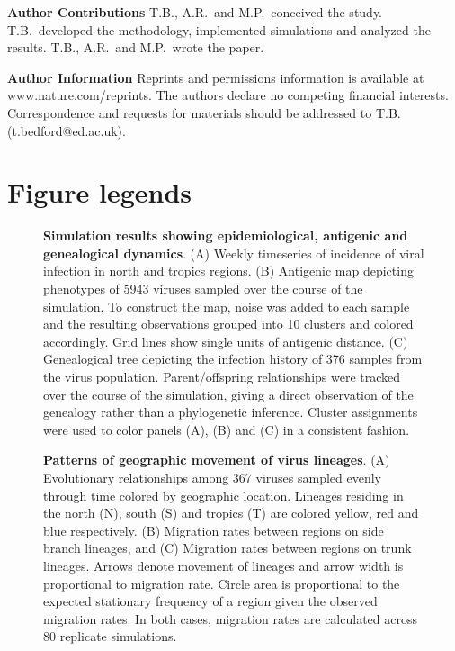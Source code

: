 \vspace{0.3cm}

\noindent \textbf{Author Contributions} T.B., A.R.\ and M.P.\ conceived the study.  T.B.\ developed the methodology, implemented simulations and analyzed the results.  T.B., A.R.\ and M.P.\ wrote the paper.

\vspace{0.3cm}

\noindent \textbf{Author Information} Reprints and permissions information is available at www.nature.com/reprints. The authors declare no competing financial interests. Correspondence and requests for materials should be addressed to T.B. (t.bedford@ed.ac.uk).

\section*{Figure legends}

\begin{figure}[H]
	\centering
	\caption{\textbf{Simulation results showing epidemiological, antigenic and genealogical dynamics}. (A) Weekly timeseries of incidence of viral infection in north and tropics regions. (B) Antigenic map depicting phenotypes of 5943 viruses sampled over the course of the simulation.  To construct the map, noise was added to each sample and the resulting observations grouped into 10 clusters and colored accordingly.  Grid lines show single units of antigenic distance. (C) Genealogical tree depicting the infection history of 376 samples from the virus population.  Parent/offspring relationships were tracked over the course of the simulation, giving a direct observation of the genealogy rather than a phylogenetic inference. Cluster assignments were used to color panels (A), (B) and (C) in a consistent fashion.}
	\label{incmaptree}
\end{figure}

\begin{figure}[H]
	\centering
	\caption{\textbf{Patterns of geographic movement of virus lineages}. (A) Evolutionary relationships among 367 viruses sampled evenly through time colored by geographic location. Lineages residing in the north (N), south (S) and tropics (T) are colored yellow, red and blue respectively. (B) Migration rates between regions on side branch lineages, and (C) Migration rates between regions on trunk lineages. Arrows denote movement of lineages and arrow width is proportional to migration rate. Circle area is proportional to the expected stationary frequency of a region given the observed migration rates.  In both cases, migration rates are calculated across 80 replicate simulations.}
	\label{spatial}
\end{figure}

